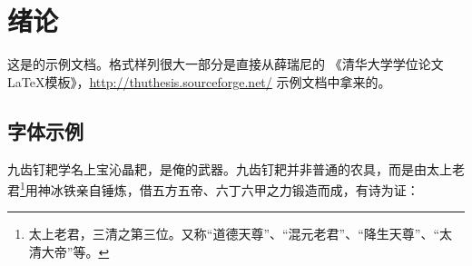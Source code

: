 \chapter{绪论}

这是的示例文档。格式样列很大一部分是直接从薛瑞尼的 {《清华大学学位论文 \LaTeX 模板》，\url{http://thuthesis.sourceforge.net/}} 示例文档中拿来的。

\section{字体示例}

九齿钉耙学名{\kaishu 上宝沁晶耙}，是俺的武器。九齿钉耙并非普通的农具，而是由太上老君\footnote{太上老君，三清之第三位。又称“道德天尊”、“混元老君”、“降生天尊”、“太清大帝”等。}用神冰铁亲自锤炼，借五方五帝、六丁六甲之力锻造而成，有诗为证：

\vspace{-5mm}

